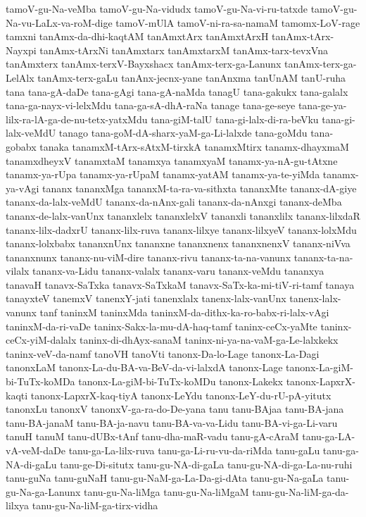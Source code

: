 {tamoV-gu-Na-veMba
tamoV-gu-Na-vidudx
tamoV-gu-Na-vi-ru-tatxde
tamoV-gu-Na-vu-LaLx-va-roM-dige
tamoV-mUlA
tamoV-ni-ra-sa-namaM
tamomx-LoV-rage
tamxni
tanAmx-da-dhi-kaqtAM
tanAmxtArx
tanAmxtArxH
tanAmx-tArx-Nayxpi
tanAmx-tArxNi
tanAmxtarx
tanAmxtarxM
tanAmx-tarx-tevxVna
tanAmxterx
tanAmx-terxV-Bayxshacx
tanAmx-terx-ga-Lanunx
tanAmx-terx-ga-LelAlx
tanAmx-terx-gaLu
tanAnx-jecnx-yane
tanAnxma
tanUnAM
tanU-ruha
tana
tana-gA-daDe
tana-gAgi
tana-gA-naMda
tanagU
tana-gakukx
tana-galalx
tana-ga-nayx-vi-lelxMdu
tana-ga-sA-dhA-raNa
tanage
tana-ge-seye
tana-ge-ya-lilx-ra-lA-ga-de-nu-tetx-yatxMdu
tana-giM-talU
tana-gi-lalx-di-ra-beVku
tana-gi-lalx-veMdU
tanago
tana-goM-dA-sharx-yaM-ga-Li-lalxde
tana-goMdu
tana-gobabx
tanaka
tanamxM-tArx-sAtxM-tirxkA
tanamxMtirx
tanamx-dhayxmaM
tanamxdheyxV
tanamxtaM
tanamxya
tanamxyaM
tanamx-ya-nA-gu-tAtxne
tanamx-ya-rUpa
tanamx-ya-rUpaM
tanamx-yatAM
tanamx-ya-te-yiMda
tanamx-ya-vAgi
tananx
tananxMga
tananxM-ta-ra-va-sithxta
tananxMte
tananx-dA-giye
tananx-da-lalx-veMdU
tananx-da-nAnx-gali
tananx-da-nAnxgi
tananx-deMba
tananx-de-lalx-vanUnx
tananxlelx
tananxlelxV
tananxli
tananxlilx
tananx-lilxdaR
tananx-lilx-dadxrU
tananx-lilx-ruva
tananx-lilxye
tananx-lilxyeV
tananx-lolxMdu
tananx-lolxbabx
tananxnUnx
tananxne
tananxnenx
tananxnenxV
tananx-niVva
tananxnunx
tananx-nu-viM-dire
tananx-rivu
tananx-ta-na-vanunx
tananx-ta-na-vilalx
tananx-va-Lidu
tananx-valalx
tananx-varu
tananx-veMdu
tananxya
tanavaH
tanavx-SaTxka
tanavx-SaTxkaM
tanavx-SaTx-ka-mi-tiV-ri-tamf
tanaya
tanayxteV
tanemxV
tanenxY-jati
tanenxlalx
tanenx-lalx-vanUnx
tanenx-lalx-vanunx
tanf
taninxM
taninxMda
taninxM-da-dithx-ka-ro-babx-ri-lalx-vAgi
taninxM-da-ri-vaDe
taninx-Sakx-la-mu-dA-haq-tamf
taninx-ceCx-yaMte
taninx-ceCx-yiM-dalalx
taninx-di-dhAyx-sanaM
taninx-ni-ya-na-vaM-ga-Le-lalxkekx
taninx-veV-da-namf
tanoVH
tanoVti
tanonx-Da-lo-Lage
tanonx-La-Dagi
tanonxLaM
tanonx-La-du-BA-va-BeV-da-vi-lalxdA
tanonx-Lage
tanonx-La-giM-bi-TuTx-koMDa
tanonx-La-giM-bi-TuTx-koMDu
tanonx-Lakekx
tanonx-LapxrX-kaqti
tanonx-LapxrX-kaq-tiyA
tanonx-LeYdu
tanonx-LeY-du-rU-pA-yitutx
tanonxLu
tanonxV
tanonxV-ga-ra-do-De-yana
tanu
tanu-BAjaa
tanu-BA-jana
tanu-BA-janaM
tanu-BA-ja-navu
tanu-BA-va-va-Lidu
tanu-BA-vi-ga-Li-varu
tanuH
tanuM
tanu-dUBx-tAnf
tanu-dha-maR-vadu
tanu-gA-cAraM
tanu-ga-LA-vA-veM-daDe
tanu-ga-La-lilx-ruva
tanu-ga-Li-ru-vu-da-riMda
tanu-gaLu
tanu-ga-NA-di-gaLu
tanu-ge-Di-situtx
tanu-gu-NA-di-gaLa
tanu-gu-NA-di-ga-La-nu-ruhi
tanu-guNa
tanu-guNaH
tanu-gu-NaM-ga-La-Da-gi-dAta
tanu-gu-Na-gaLa
tanu-gu-Na-ga-Lanunx
tanu-gu-Na-liMga
tanu-gu-Na-liMgaM
tanu-gu-Na-liM-ga-da-lilxya
tanu-gu-Na-liM-ga-tirx-vidha
}
